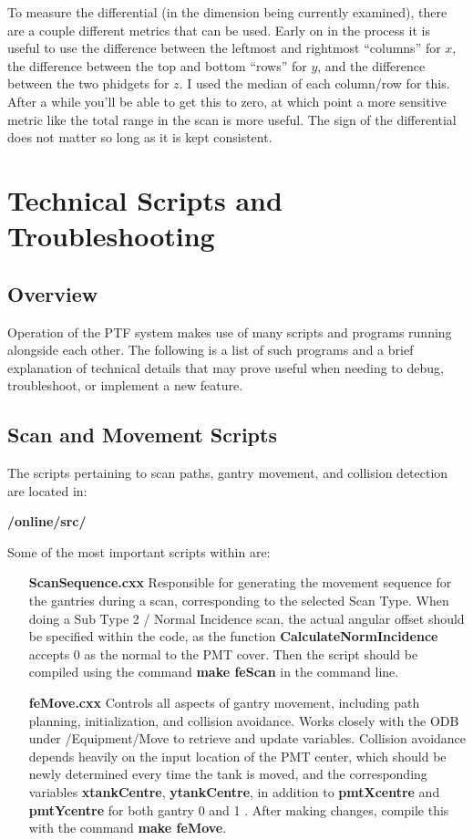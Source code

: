 \documentclass[twoside,letterpaper]{refart}
\begin{document}
To measure the differential (in the dimension being currently examined), there are a couple different metrics that can be used. Early on in the process it is useful to use the difference between the leftmost and rightmost ``columns'' for \(x\), the difference between the top and bottom ``rows'' for \(y\), and the difference between the two phidgets for \(z\). I used the median of each column/row for this. After a while you'll be able to get this to zero, at which point a more sensitive metric like the total range in the scan is more useful. The sign of the differential does not matter so long as it is kept consistent.


\clearpage



\section{Technical Scripts and Troubleshooting}

\subsection{Overview}

Operation of the PTF system makes use of many scripts and programs running alongside each other. The following is a list of such programs and a brief explanation of technical details that may prove useful when needing to debug, troubleshoot, or implement a new feature.

\subsection{Scan and Movement Scripts} \label{scanScripts}

The scripts pertaining to scan paths, gantry movement, and collision detection are located in:

\textbf{/online/src/}

Some of the most important scripts within are:

\begin{itemize}
	\item [\textbf{ScanSequence.cxx}] Responsible for generating the movement sequence for the gantries during a scan, corresponding to the selected Scan Type. When doing a Sub Type 2 / Normal Incidence scan, the actual angular offset should be specified within the code, as the function \textbf{CalculateNormIncidence} accepts 0 as the normal to the PMT cover. Then the script should be compiled using the command \textbf{make feScan} in the command line.
	\item [\textbf{feMove.cxx}] Controls all aspects of gantry movement, including path planning, initialization, and collision avoidance. Works closely with the ODB under /Equipment/Move to retrieve and update variables. Collision avoidance depends heavily on the input location of the PMT center, which should be newly determined every time the tank is moved, and the corresponding variables \textbf{xtankCentre}, \textbf{ytankCentre}, in addition to \textbf{pmtXcentre} and \textbf{pmtYcentre} for both gantry 0 and 1 . After making changes, compile this with the command \textbf{make feMove}.
\end{itemize}
\end{document}

